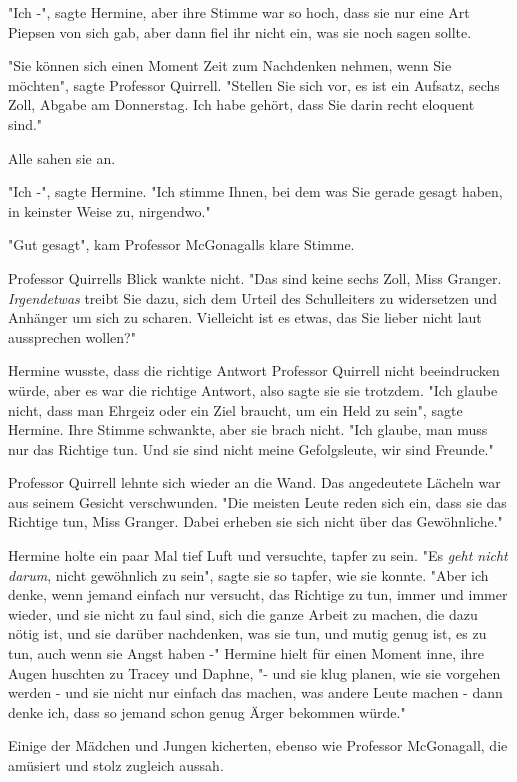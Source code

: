 {"Ich -", sagte Hermine, aber ihre Stimme war so hoch, dass sie nur eine Art Piepsen von sich gab, aber dann fiel ihr nicht ein, was sie noch sagen sollte.

"Sie können sich einen Moment Zeit zum Nachdenken nehmen, wenn Sie möchten", sagte Professor Quirrell. "Stellen Sie sich vor, es ist ein Aufsatz, sechs Zoll, Abgabe am Donnerstag. Ich habe gehört, dass Sie darin recht eloquent sind."

Alle sahen sie an.

"Ich -", sagte Hermine. "Ich stimme Ihnen, bei dem was Sie gerade gesagt haben, in keinster Weise zu, nirgendwo."

"Gut gesagt", kam Professor McGonagalls klare Stimme.

Professor Quirrells Blick wankte nicht. "Das sind keine sechs Zoll, Miss Granger. \emph{Irgendetwas} treibt Sie dazu, sich dem Urteil des Schulleiters zu widersetzen und Anhänger um sich zu scharen. Vielleicht ist es etwas, das Sie lieber nicht laut aussprechen wollen?"

Hermine wusste, dass die richtige Antwort Professor Quirrell nicht beeindrucken würde, aber es war die richtige Antwort, also sagte sie sie trotzdem. "Ich glaube nicht, dass man Ehrgeiz oder ein Ziel braucht, um ein Held zu sein", sagte Hermine. Ihre Stimme schwankte, aber sie brach nicht. "Ich glaube, man muss nur das Richtige tun. Und sie sind nicht meine Gefolgsleute, wir sind Freunde."

Professor Quirrell lehnte sich wieder an die Wand. Das angedeutete Lächeln war aus seinem Gesicht verschwunden. "Die meisten Leute reden sich ein, dass sie das Richtige tun, Miss Granger. Dabei erheben sie sich nicht über das Gewöhnliche."

Hermine holte ein paar Mal tief Luft und versuchte, tapfer zu sein. "Es \emph{geht nicht darum}, nicht gewöhnlich zu sein", sagte sie so tapfer, wie sie konnte. "Aber ich denke, wenn jemand einfach nur versucht, das Richtige zu tun, immer und immer wieder, und sie nicht zu faul sind, sich die ganze Arbeit zu machen, die dazu nötig ist, und sie darüber nachdenken, was sie tun, und mutig genug ist, es zu tun, auch wenn sie Angst haben -" Hermine hielt für einen Moment inne, ihre Augen huschten zu Tracey und Daphne, "- und sie klug planen, wie sie vorgehen werden - und sie nicht nur einfach das machen, was andere Leute machen - dann denke ich, dass so jemand schon genug Ärger bekommen würde."

Einige der Mädchen und Jungen kicherten, ebenso wie Professor McGonagall, die amüsiert und stolz zugleich aussah.

}
